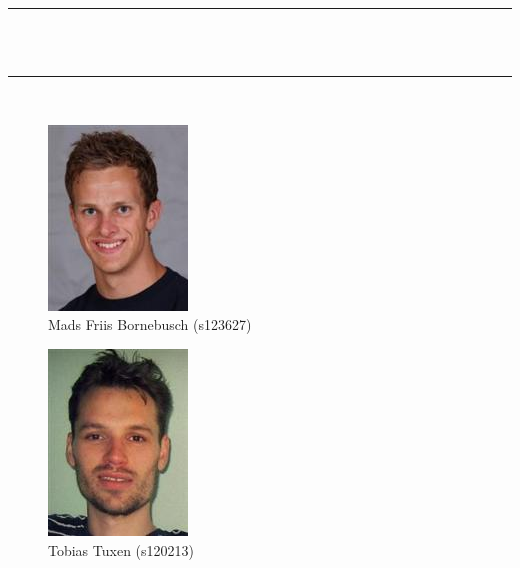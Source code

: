 \begin{center}
\rule{\textwidth}{1mm}\\
\vspace{1cm}
\Huge\bfseries \titel\\
\vspace{0.7cm}
\rule{\textwidth}{1mm}\\

\begin{figure}[h!]
	\centering
	\begin{minipage}{0.40\linewidth}
	\begin{center}
	\includegraphics[scale=0.55]{figs/mads.jpeg} \\
	Mads Friis Bornebusch (s123627)\\ [10pt]
		\vspace{0.15cm}
	\end{center}
	\end{minipage}
\end{figure}

\begin{figure}[h!]
	\centering
	\begin{minipage}{0.40\linewidth}
	\begin{center}
	\includegraphics[scale=0.55]{figs/tobias.png} \\
	Tobias Tuxen (s120213)\\[10pt]
		\vspace{0.15cm}
	\end{center}
	\end{minipage}
\end{figure}


\end{center}
